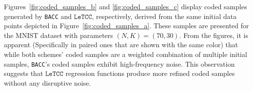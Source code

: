 \documentclass{article}
\def\nprcc{\texttt{LeTCC}}
\begin{document}
Figures~\ref{fig:coded_samples_b} and \ref{fig:coded_samples_c} display coded samples generated by \texttt{BACC} and $\nprcc$, respectively, derived from the same initial data points depicted in Figure~\ref{fig:coded_samples_a}. These samples are presented for the MNIST dataset with parameters $(N, K) = (70, 30)$. From the figures, it is apparent (Specifically in paired ones that are shown with the same color) that while both schemes' coded samples are a weighted combination of multiple initial samples, \texttt{BACC}'s coded samples exhibit high-frequency noise. This observation suggests that $\nprcc$ regression functions produce more refined coded samples without any disruptive noise.
\end{document}
